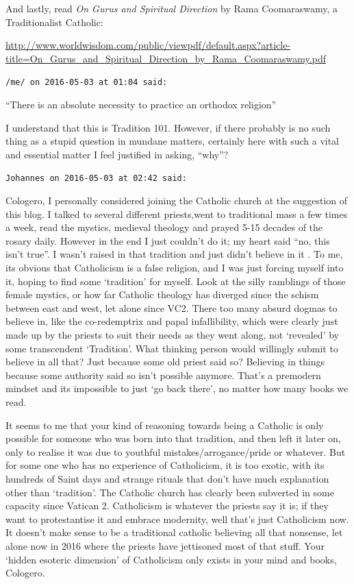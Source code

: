 \begin{footnotesize}
\begin{sffamily}
And lastly, read \textit{On Gurus and Spiritual Direction} by Rama Coomaraswamy, a Traditionalist Catholic:

\url{http://www.worldwisdom.com/public/viewpdf/default.aspx?article-title=On_Gurus_and_Spiritual_Direction_by_Rama_Coomaraswamy.pdf}


\hfill

\texttt{/me/ on 2016-05-03 at 01:04 said:}

``There is an absolute necessity to practice an orthodox religion''

I understand that this is Tradition 101. However, if there probably is no such thing as a stupid question in mundane matters, certainly here with such a vital and essential matter I feel justified in asking, ``why''?

\hfill

\texttt{Johannes on 2016-05-03 at 02:42 said:}

Cologero, I personally considered joining the Catholic church at the suggestion of this blog. I talked to several different priests,went to traditional mass a few times a week, read the mystics, medieval theology and prayed 5-15 decades of the rosary daily. However in the end I just couldn't do it; my heart said ``no, this isn't true''. I wasn't raised in that tradition and just didn't believe in it . To me, its obvious that Catholicism is a false religion, and I was just forcing myself into it, hoping to find some `tradition' for myself. Look at the silly ramblings of those female mystics, or how far Catholic theology has diverged since the schism between east and west, let alone since VC2. There too many absurd dogmas to believe in, like the co-redemptrix and papal infallibility, which were clearly just made up by the priests to suit their needs as they went along, not `revealed' by some transcendent `Tradition'. What thinking person would willingly submit to believe in all that? Just because some old priest said so? Believing in things because some authority said so isn't possible anymore. That's a premodern mindset and its impossible to just `go back there', no matter how many books we read.

It seems to me that your kind of reasoning towards being a Catholic is only possible for someone who was born into that tradition, and then left it later on, only to realise it was due to youthful mistakes/arrogance/pride or whatever. But for some one who has no experience of Catholicism, it is too exotic, with its hundreds of Saint days and strange rituals that don't have much explanation other than `tradition'. The Catholic church has clearly been subverted in some capacity since Vatican 2. Catholicism is whatever the priests say it is; if they want to protestantise it and embrace modernity, well that's just Catholicism now. It doesn't make sense to be a traditional catholic believing all that nonsense, let alone now in 2016 where the priests have jettisoned most of that stuff. Your `hidden esoteric dimension' of Catholicism only exists in your mind and books, Cologero.


\end{sffamily}
\end{footnotesize}
